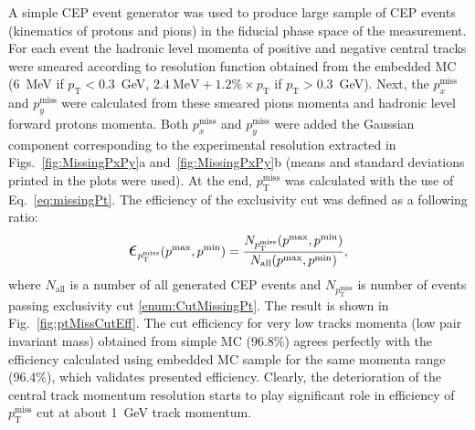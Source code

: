 A simple CEP event generator was used to produce large sample of CEP events (kinematics of protons and pions) in the fiducial phase space of the measurement. For each event the hadronic level momenta of positive and negative central tracks were smeared according to resolution function obtained from the embedded MC (6~MeV if $p_{\text{T}}<0.3$~GeV, $2.4~\text{MeV} + 1.2\%\times p_{\text{T}}$ if $p_{\text{T}}>0.3$~GeV). Next, the $p_{x}^{\text{miss}}$ and $p_{y}^{\text{miss}}$ were calculated from these smeared pions momenta and hadronic level forward protons momenta. Both $p_{x}^{\text{miss}}$ and $p_{y}^{\text{miss}}$ were added the Gaussian component corresponding to the experimental resolution extracted in Figs.~\ref{fig:MissingPxPy}a and~\ref{fig:MissingPxPy}b (means and standard deviations printed in the plots were used). At the end, $p_{\text{T}}^{\text{miss}}$ was calculated with the use of Eq.~\eqref{eq:missingPt}. The efficiency of the exclusivity cut was defined as a following ratio:
\begin{equation}\label{eq:ptMissCutEff}
 \mbox{\LARGE$\epsilon$}_{p_{\text{T}}^{\text{miss}}}(p^{\text{max}}, p^{\text{min}}) = \frac{N_{p_{\text{T}}^{\text{miss}}}(p^{\text{max}}, p^{\text{min}})}{N_{\text{all}}(p^{\text{max}}, p^{\text{min}})},
\end{equation}
where $N_{\text{all}}$ is a number of all generated CEP events and $N_{p_{\text{T}}^{\text{miss}}} $ is number of events passing exclusivity cut \ref{enum:CutMissingPt}. The result is shown in Fig.~\ref{fig:ptMissCutEff}. The cut efficiency for very low tracks momenta (low pair invariant mass) obtained from simple MC (96.8\%) agrees perfectly with the efficiency calculated using embedded MC sample for the same momenta range (96.4\%), which validates presented efficiency. Clearly, the deterioration of the central track momentum resolution starts to play significant role in efficiency of $p_{\text{T}}^{\text{miss}}$ cut at about 1~GeV track momentum.


